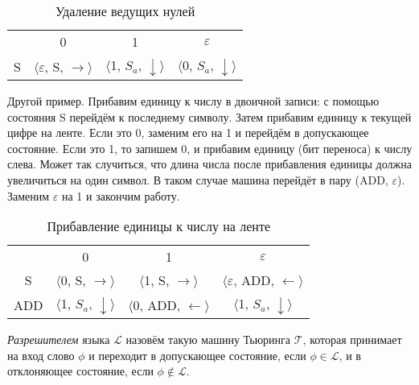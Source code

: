\documentclass{article}
\begin{document}
\begin{table}[h]
    \centering
    \begin{tabular}{c c c c}
        & 0 & 1 & $\varepsilon$ \\
        
        S & 
        $\langle\varepsilon$, S, $\rightarrow\rangle$ & 
        $\langle$1, $S_a$, $\downarrow\rangle$ & 
        $\langle$0, $S_a$, $\downarrow\rangle$ \\
    \end{tabular}
    \begin{flushleft}
    \caption[Пример ]{Удаление ведущих нулей}
    \end{flushleft}
    \label{tab:my_label}
\end{table}

Другой пример. Прибавим единицу к числу в двоичной записи: с помощью состояния S перейдём к последнему символу. Затем прибавим единицу к текущей цифре на ленте. Если это 0, заменим его на 1 и перейдём в допускающее состояние. Если это 1, то запишем 0, и прибавим единицу (бит переноса) к числу слева. Может так случиться, что длина числа после прибавления единицы должна увеличиться на один символ. В таком случае машина перейдёт в пару (ADD, $\varepsilon$). Заменим $\varepsilon$ на 1 и закончим работу.

\begin{table}[h]
    \centering
    \begin{tabular}{c c c c}
        & 0 & 1 & $\varepsilon$ \\
        
        S &
        $\langle$0, S, $\rightarrow\rangle$ & 
        $\langle$1, S, $\rightarrow\rangle$ & 
        $\langle\varepsilon$, ADD, $\leftarrow\rangle$ \\
        
        ADD &
        $\langle$1, $S_a$, $\downarrow\rangle$ &
        $\langle$0, ADD, $\leftarrow\rangle$ &
        $\langle$1, $S_a$, $\downarrow\rangle$ \\
        
    \end{tabular}
    \caption{Прибавление единицы к числу на ленте}
    \label{tab:my_label}
\end{table}

\begin{definition} \textit{Разрешителем} языка $\mathcal{L}$ назовём такую машину Тьюринга $\mathcal{T}$, которая принимает на вход слово $\phi$ и переходит в допускающее состояние, если $\phi \in \mathcal{L}$, и в отклоняющее состояние, если $\phi \notin \mathcal{L}$.
\end{definition} 
\end{document}
